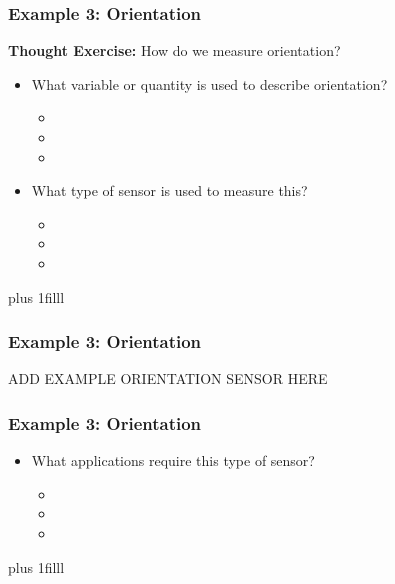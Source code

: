 \documentclass[fleqn]{beamer} %
\newcommand{\sectionIsubsectionIVtitle}{Example 3: Orientation}
\newcommand{\btVFill}{\vskip0pt plus 1filll}
\begin{document}
			\begin{frame}
				\frametitle{\sectionIsubsectionIVtitle}
				{\bf Thought Exercise:} How do we measure {\PR orientation}?        
	
				\begin{itemize}
					
					\item What variable or quantity is used to describe {\PR orientation}?                         
					\begin{itemize}
						\item
						\item
						\item	
					\end{itemize} \vspace{5mm}
					\item What type of sensor is used to measure this?
					\begin{itemize}
						\item
						\item
						\item	
					\end{itemize}	
					
				\end{itemize}
				
				\btVFill
	
			\end{frame}

			\begin{frame}
				\frametitle{\sectionIsubsectionIVtitle}
				ADD EXAMPLE ORIENTATION SENSOR HERE

			\end{frame}

			\begin{frame}
				\frametitle{\sectionIsubsectionIVtitle}

				\begin{itemize}
					\item What applications require this type of sensor?
					\begin{itemize}
						\item \vspace{5mm}
						\item \vspace{5mm}
						\item \vspace{5mm}	
					\end{itemize}
				\end{itemize}
				
				\btVFill
			\end{frame}
\end{document}
